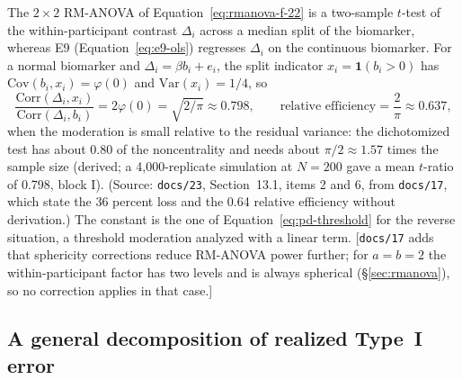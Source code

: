 \documentclass[11pt]{article}
\newcommand{\note}[1]{\textcolor{blue!60!black}{\small [#1]}}
\newcommand{\code}[1]{\texttt{#1}}
\begin{document}
The $2\times2$ RM-ANOVA of Equation~\eqref{eq:rmanova-f-22} is a
two-sample $t$-test of the within-participant contrast $\Delta_i$
across a median split of the biomarker, whereas E9
(Equation~\eqref{eq:e9-ols}) regresses $\Delta_i$ on the continuous
biomarker. For a normal biomarker and $\Delta_i = \beta b_i + e_i$, the
split indicator $x_i = \mathbf 1(b_i > 0)$ has
$\mathrm{Cov}(b_i, x_i) = \varphi(0)$ and $\mathrm{Var}(x_i) = 1/4$, so
\begin{equation}
\frac{\mathrm{Corr}(\Delta_i, x_i)}{\mathrm{Corr}(\Delta_i, b_i)}
  = 2\varphi(0) = \sqrt{2/\pi} \approx 0.798,
\qquad
\text{relative efficiency} = \frac{2}{\pi} \approx 0.637,
\label{eq:inva-dichot}
\end{equation}
when the moderation is small relative to the residual variance: the
dichotomized test has about 0.80 of the noncentrality and needs about
$\pi/2 \approx 1.57$ times the sample size (derived; a 4,000-replicate
simulation at $N = 200$ gave a mean $t$-ratio of 0.798, block I).
(Source: \code{docs/23}, Section~13.1, items 2 and 6, from
\code{docs/17}, which state the 36 percent loss and the 0.64 relative
efficiency without derivation.) The constant is the one of
Equation~\eqref{eq:pd-threshold} for the reverse situation, a threshold
moderation analyzed with a linear term. \note{\code{docs/17} adds that
sphericity corrections reduce RM-ANOVA power further; for $a = b = 2$
the within-participant factor has two levels and is always spherical
(\S\ref{sec:rmanova}), so no correction applies in that case.}

\subsection{A general decomposition of realized Type~I error}
\label{sec:calibration}
\end{document}
